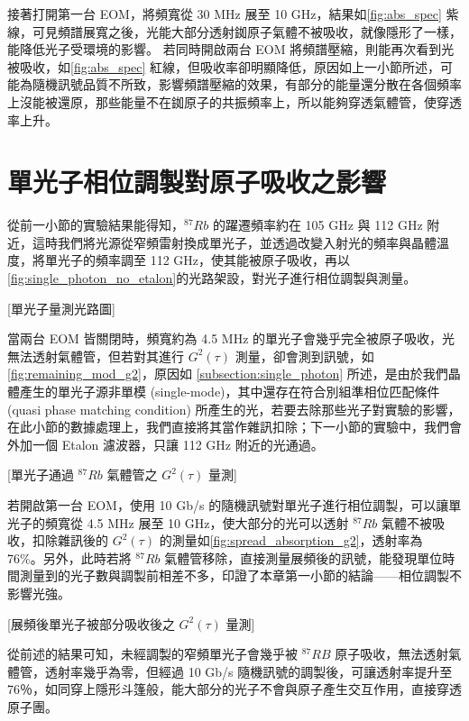 \documentclass[class=NCU_thesis, crop=false]{standalone}
\begin{document}
接著打開第一台 EOM，將頻寬從 30 MHz 展至 10 GHz，結果如\cref{fig:abs_spec} 紫線，可見頻譜展寬之後，光能大部分透射銣原子氣體不被吸收，就像隱形了一樣，能降低光子受環境的影響。
若同時開啟兩台 EOM 將頻譜壓縮，則能再次看到光被吸收，如\cref{fig:abs_spec} 紅線，但吸收率卻明顯降低，原因如上一小節所述，可能為隨機訊號品質不所致，影響頻譜壓縮的效果，有部分的能量還分散在各個頻率上沒能被還原，那些能量不在銣原子的共振頻率上，所以能夠穿透氣體管，使穿透率上升。

\section{單光子相位調製對原子吸收之影響}
從前一小節的實驗結果能得知，$^{87}Rb$ 的躍遷頻率約在 105 GHz 與 112 GHz 附近，這時我們將光源從窄頻雷射換成單光子，並透過改變入射光的頻率與晶體溫度，將單光子的頻率調至 112 GHz，使其能被原子吸收，再以\cref{fig:single_photon_no_etalon}的光路架設，對光子進行相位調製與測量。

[單光子量測光路圖]

當兩台 EOM 皆關閉時，頻寬約為 4.5 MHz 的單光子會幾乎完全被原子吸收，光無法透射氣體管，但若對其進行 $G^{2}(\tau)$ 測量，卻會測到訊號，如\cref{fig:remaining_mod_g2}，原因如 \ref{subsection:single_photon} 所述，是由於我們晶體產生的單光子源非單模 (single-mode)，其中還存在符合別組準相位匹配條件 (quasi phase matching condition) 所產生的光，若要去除那些光子對實驗的影響，在此小節的數據處理上，我們直接將其當作雜訊扣除；下一小節的實驗中，我們會外加一個 Etalon 濾波器，只讓 112 GHz 附近的光通過。

[單光子通過 $^{87}Rb$ 氣體管之 $G^{2}(\tau)$ 量測]

若開啟第一台 EOM，使用 10 Gb/s 的隨機訊號對單光子進行相位調製，可以讓單光子的頻寬從 4.5 MHz 展至 10 GHz，使大部分的光可以透射 $^{87}Rb$ 氣體不被吸收，扣除雜訊後的 $G^2(\tau)$ 的測量如\cref{fig:spread_absorption_g2}，透射率為 76\%。另外，此時若將 $^{87}Rb$ 氣體管移除，直接測量展頻後的訊號，能發現單位時間測量到的光子數與調製前相差不多，印證了本章第一小節的結論——相位調製不影響光強。

[展頻後單光子被部分吸收後之 $G^{2}(\tau)$ 量測]

從前述的結果可知，未經調製的窄頻單光子會幾乎被 $^{87}RB$ 原子吸收，無法透射氣體管，透射率幾乎為零，但經過 10 Gb/s 隨機訊號的調製後，可讓透射率提升至 76％，如同穿上隱形斗篷般，能大部分的光子不會與原子產生交互作用，直接穿透原子團。
\end{document}
